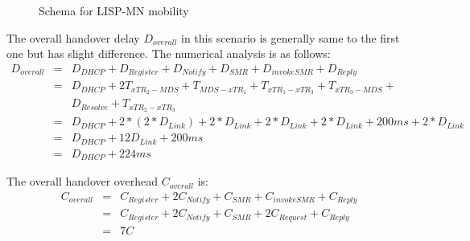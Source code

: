 {\begin{figure}[!th]
	\caption{Schema for LISP-MN mobility}
	\label{sim_schema_xTR}
\end{figure}

The overall handover delay $D_{overall}$ in this scenario is generally same to the first one but has slight difference. The numerical analysis is as follows:
\begin{eqnarray}
D_{overall} &=& D_{DHCP} + D_{Register} + D_{Notify} + D_{SMR} + D_{invokeSMR} + D_{Reply} \nonumber \\
&=& D_{DHCP} + 2T_{xTR_2-MDS} + T_{MDS-xTR_1} + T_{xTR_1-xTR_3} + T_{xTR_3-MDS} + \nonumber \\
& & D_{Resolve} + T_{xTR_2-xTR_3} \nonumber \\
&=& D_{DHCP} +2* (2*D_{Link}) + 2*D_{Link} + 2*D_{Link} + 2*D_{Link} + 200ms + 2*D_{Link} \nonumber \\
&=& D_{DHCP} + 12D_{Link} + 200 ms  \\
&=& D_{DHCP} + 224 ms \nonumber
\end{eqnarray}

The overall handover overhead $C_{overall}$ is:
\begin{eqnarray}
C_{overall} &=& C_{Register} + 2C_{Notify} + C_{SMR} + C_{invokeSMR} + C_{Reply} \nonumber \\
&=& C_{Register} + 2C_{Notify} + C_{SMR} + 2C_{Request} + C_{Reply} \nonumber \\
&=& 7 C
\end{eqnarray}

}
